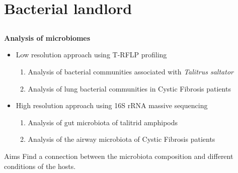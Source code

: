 \documentclass[10pt]{beamer}
\begin{document}
\section{Bacterial landlord}
\subsection{}

\begin{frame}
	\textbf{\Large{Analysis of microbiomes}}
	\vspace{4mm}
	\begin{itemize}
		\item Low resolution approach using T-RFLP profiling
		\begin{enumerate}
			\item Analysis of bacterial communities associated with \textit{Talitrus saltator}
			\item Analysis of lung bacterial communities in Cystic Fibrosis patients
		\end{enumerate}
		\item High resolution approach using 16S rRNA massive sequencing
		\begin{enumerate}
			\item Analysis of gut microbiota of talitrid amphipods
			\item Analysis of the airway microbiota of Cystic Fibrosis patients
		\end{enumerate}
	\end{itemize}
	\vspace{4mm}
	\begin{block}{Aims}
		Find a connection between the microbiota composition and different conditions of the hosts.
	\end{block}
\end{frame}
\end{document}
